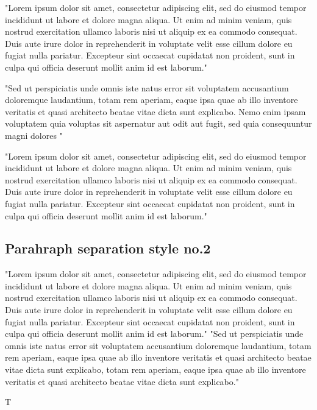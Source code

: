 \documentclass[wide]{cluu}
\begin{document}
"Lorem ipsum dolor sit amet, consectetur adipiscing elit, sed do eiusmod tempor incididunt ut labore et dolore magna aliqua. Ut enim ad minim veniam, quis nostrud exercitation ullamco laboris nisi ut aliquip ex ea commodo consequat. Duis aute irure dolor in reprehenderit in voluptate velit esse cillum dolore eu fugiat nulla pariatur. Excepteur sint occaecat cupidatat non proident, sunt in culpa qui officia deserunt mollit anim id est laborum."

"Sed ut perspiciatis unde omnis iste natus error sit voluptatem accusantium doloremque laudantium, totam rem aperiam, eaque ipsa quae ab illo inventore veritatis et quasi architecto beatae vitae dicta sunt explicabo. Nemo enim ipsam voluptatem quia voluptas sit aspernatur aut odit aut fugit, sed quia consequuntur magni dolores "

"Lorem ipsum dolor sit amet, consectetur adipiscing elit, sed do eiusmod tempor incididunt ut labore et dolore magna aliqua. Ut enim ad minim veniam, quis nostrud exercitation ullamco laboris nisi ut aliquip ex ea commodo consequat. Duis aute irure dolor in reprehenderit in voluptate velit esse cillum dolore eu fugiat nulla pariatur. Excepteur sint occaecat cupidatat non proident, sunt in culpa qui officia deserunt mollit anim id est laborum."



\subsection{Parahraph separation style no.2}

"Lorem ipsum dolor sit amet, consectetur adipiscing elit, sed do eiusmod tempor incididunt ut labore et dolore magna aliqua. Ut enim ad minim veniam, quis nostrud exercitation ullamco laboris nisi ut aliquip ex ea commodo consequat. Duis aute irure dolor in reprehenderit in voluptate velit esse cillum dolore eu fugiat nulla pariatur. Excepteur sint occaecat cupidatat non proident, sunt in culpa qui officia deserunt mollit anim id est laborum."
\newline
\newline
"Sed ut perspiciatis unde omnis iste natus error sit voluptatem accusantium doloremque laudantium, totam rem aperiam, eaque ipsa quae ab illo inventore veritatis et quasi architecto beatae vitae dicta sunt explicabo, totam rem aperiam, eaque ipsa quae ab illo inventore veritatis et quasi architecto beatae vitae dicta sunt explicabo."

T\citep{jurafsky2012natural}
\cite{jurafsky2012natural}


\setlength{\bibsep}{7pt}

\end{document}
